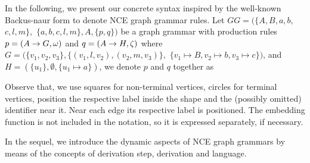 In the following, we present our concrete syntax inspired by the well-known Backus-naur form to denote NCE graph grammar rules. Let $GG = (\{A, B, a, b,$ $ c, l, m\},$ $\{a, b, c, l, m\}, A, \{p,q\})$ be a graph grammar with production rules $p = (A \to G,\omega)$ and $q = (A \to H,\zeta)$ where $G = (\{v_1, v_2, v_3\}, \{(v_1,l,v_2), (v_2,m,v_3)\},$ $\{v_1 \mapsto B, v_2 \mapsto b, v_3 \mapsto c \})$, and $H = (\{u_1\}, \emptyset, \{u_1 \mapsto a\})$, we denote $p$ and $q$ together as
	


Observe that, we use squares for non-terminal vertices, circles for terminal vertices, position the respective label inside the shape and the (possibly omitted) identifier near it. Near each edge its respective label is positioned. The embedding function is not included in the notation, so it is expressed separately, if necessary.


In the sequel, we introduce the dynamic aspects of NCE graph grammars by means of the concepts of derivation step, derivation and language.

